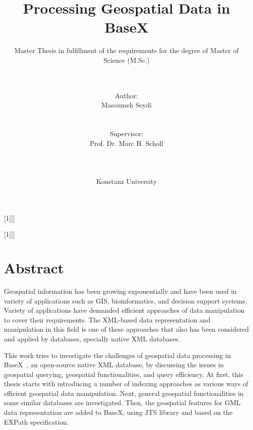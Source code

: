\documentclass[a4paper,12pt]{article}
\title{Processing Geospatial Data in BaseX}
\subtitle{Master Thesis in fulfillment of the requirements for the degree of
Master of Science (M.Sc.)}
\author{\\\\Author: \\
	Masoumeh Seydi
	\\\\\\Supervisor: \\
	Prof. Dr. Marc H. Scholl \\ 
	\\\\\\
	Konstanz University}
\begin{document}
[1][]{
\lstset{#1}}{}

[1][]{
\lstset{#1}}{}


\renewcommand{\lstlistingname}{Code}


\maketitle
\thispagestyle{empty}

\newpage
\section*{Abstract}
Geospatial information has been growing exponentially and have been used in variety of applications such as GIS, bioinformatics, and decision support systems. 
Variety of applications have demanded efficient approaches of data manipulation to cover their requirements. 
The XML-based data representation and manipulation in this field is one of these approaches that also has been considered and applied by databases, specially native XML databases. 

This work tries to investigate the challenges of geospatial data processing in BaseX~\cite{www/basex}, an open-source native XML database, by discussing the issues in geospatial querying, geospatial functionalities, and query efficiency. 
At first, this thesis starts with introducing a number of indexing approaches as various ways of efficient geospatial data manipulation. 
Next, general geospatial functionalities in some similar databases are investigated. 
Then, the geospatial features for GML~\cite{gml} data representation are added to BaseX, using JTS library and based on the EXPath specification.
\end{document}

